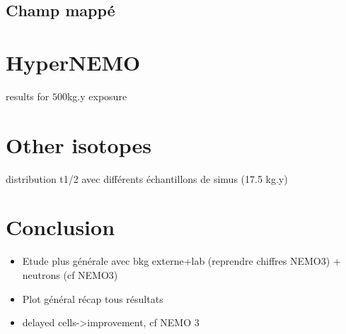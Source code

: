 \subsection{Champ mappé}


\section{HyperNEMO}
results for $500$kg.y exposure

\section{Other isotopes}

distribution t1/2 avec différents échantillons de simus (17.5 kg.y)

\section{Conclusion}
\begin{itemize}
\item Etude plus générale avec bkg externe+lab (reprendre chiffres NEMO3) + neutrons (cf NEMO3)
\item Plot général récap tous résultats
\item delayed cells->improvement, cf NEMO 3
\end{itemize}
